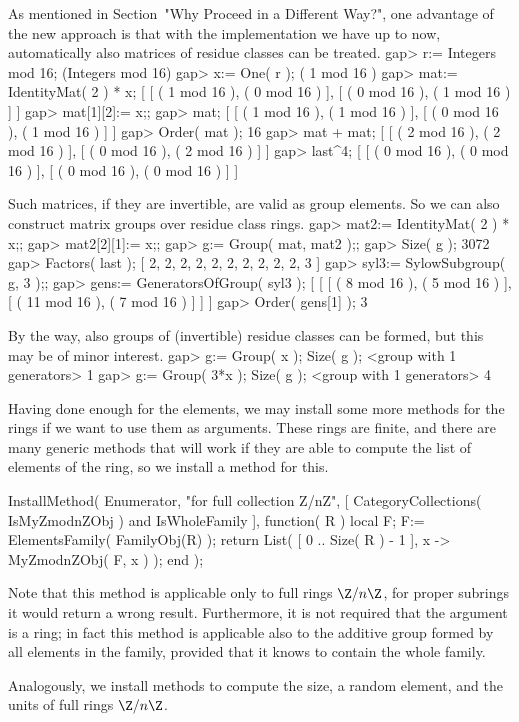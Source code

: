 As mentioned in Section~"Why Proceed in a Different Way?",
one advantage of the new approach is that with the implementation
we have up to now, automatically also matrices of residue classes
can be treated.
\begintt
gap> r:= Integers mod 16;
(Integers mod 16)
gap> x:= One( r );
( 1 mod 16 )
gap> mat:= IdentityMat( 2 ) * x;
[ [ ( 1 mod 16 ), ( 0 mod 16 ) ],
  [ ( 0 mod 16 ), ( 1 mod 16 ) ] ]
gap> mat[1][2]:= x;;
gap> mat;
[ [ ( 1 mod 16 ), ( 1 mod 16 ) ],
  [ ( 0 mod 16 ), ( 1 mod 16 ) ] ]
gap> Order( mat );
16
gap> mat + mat;
[ [ ( 2 mod 16 ), ( 2 mod 16 ) ],
  [ ( 0 mod 16 ), ( 2 mod 16 ) ] ]
gap> last^4;
[ [ ( 0 mod 16 ), ( 0 mod 16 ) ],
  [ ( 0 mod 16 ), ( 0 mod 16 ) ] ]
\endtt

Such matrices, if they are invertible, are valid as group elements.
So we can also construct matrix groups over residue class rings.
\begintt
gap> mat2:= IdentityMat( 2 ) * x;;
gap> mat2[2][1]:= x;;
gap> g:= Group( mat, mat2 );;
gap> Size( g );
3072
gap> Factors( last );
[ 2, 2, 2, 2, 2, 2, 2, 2, 2, 2, 3 ]
gap> syl3:= SylowSubgroup( g, 3 );;
gap> gens:= GeneratorsOfGroup( syl3 );
[ [ [ ( 8 mod 16 ), ( 5 mod 16 ) ], [ ( 11 mod 16 ), ( 7 mod 16 ) ] ] ]
gap> Order( gens[1] );
3
\endtt

By the way, also groups of (invertible) residue classes can be formed,
but this may be of minor interest.
\begintt
gap> g:= Group( x );  Size( g );
<group with 1 generators>
1
gap> g:= Group( 3*x );  Size( g );
<group with 1 generators>
4
\endtt

Having done enough for the elements,
we may install some more methods for the rings
if we want to use them as arguments.
These rings are finite,
and there are many generic methods that will work if they are able
to compute the list of elements of the ring,
so we install a method for this.

\begintt
InstallMethod( Enumerator,
    "for full collection Z/nZ",
    [ CategoryCollections( IsMyZmodnZObj ) and IsWholeFamily ],
    function( R )
    local F;
    F:= ElementsFamily( FamilyObj(R) );
    return List( [ 0 .. Size( R ) - 1 ], x -> MyZmodnZObj( F, x ) );
    end );
\endtt

Note that this method is applicable only to full rings $\Z/n\Z$,
for proper subrings it would return a wrong result.
Furthermore, it is not required that the argument is a ring;
in fact this method is applicable also to the additive group
formed by all elements in the family,
provided that it knows to contain the whole family.

Analogously, we install methods to compute the size,
a random element, and the units of full rings $\Z/n\Z$.

